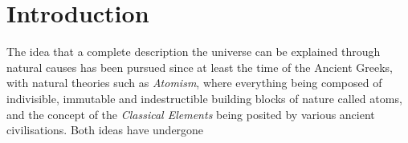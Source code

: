 \chapter{Introduction}\label{chapter:intro}


The idea that a complete description the universe can be explained through natural causes has been pursued since at least the time of the Ancient Greeks, with natural theories such as \emph{Atomism}, where everything being composed of indivisible, immutable and indestructible building blocks of nature called atoms, and the concept of the \emph{Classical Elements} being posited by various ancient civilisations.
Both ideas have undergone 
